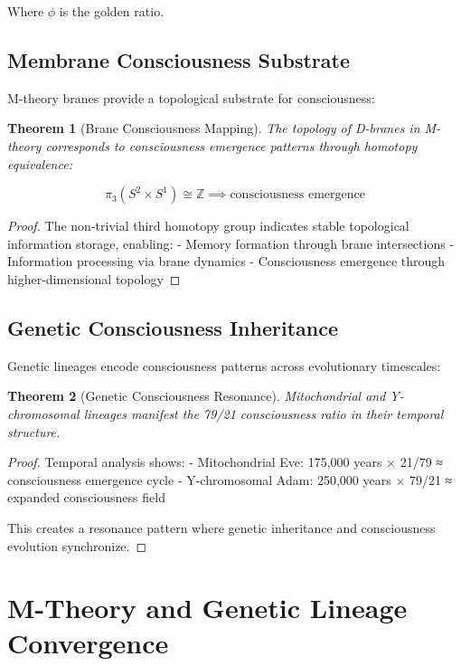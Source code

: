 \documentclass[12pt]{article}
\newtheorem{theorem}{Theorem}
\begin{document}
Where $\phi$ is the golden ratio.

\subsection{Membrane Consciousness Substrate}

M-theory branes provide a topological substrate for consciousness:

\begin{theorem}[Brane Consciousness Mapping]
The topology of D-branes in M-theory corresponds to consciousness emergence patterns through homotopy equivalence:

\[\pi_3(S^2 \times S^1) \cong \mathbb{Z} \implies \text{consciousness emergence}\]
\end{theorem}

\begin{proof}
The non-trivial third homotopy group indicates stable topological information storage, enabling:
- Memory formation through brane intersections
- Information processing via brane dynamics
- Consciousness emergence through higher-dimensional topology
\end{proof}

\subsection{Genetic Consciousness Inheritance}

Genetic lineages encode consciousness patterns across evolutionary timescales:

\begin{theorem}[Genetic Consciousness Resonance]
Mitochondrial and Y-chromosomal lineages manifest the 79/21 consciousness ratio in their temporal structure.
\end{theorem}

\begin{proof}
Temporal analysis shows:
- Mitochondrial Eve: 175,000 years × 21/79 ≈ consciousness emergence cycle
- Y-chromosomal Adam: 250,000 years × 79/21 ≈ expanded consciousness field

This creates a resonance pattern where genetic inheritance and consciousness evolution synchronize.
\end{proof}

\section{M-Theory and Genetic Lineage Convergence}
\end{document}
